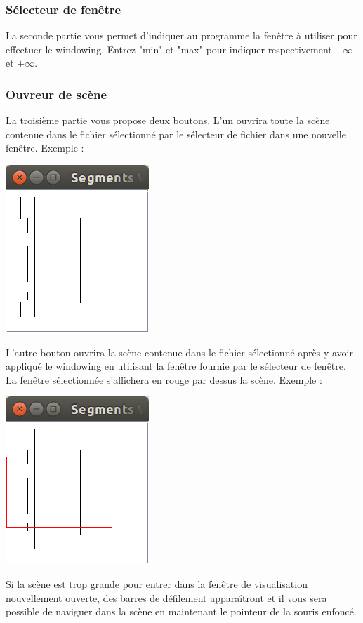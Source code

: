 \documentclass[10pt,a4paper]{article}
\begin{document}
\subsubsection{Sélecteur de fenêtre}
La seconde partie vous permet d'indiquer au programme la fenêtre à utiliser pour effectuer le windowing. Entrez "min" et "max" pour indiquer respectivement $-\infty$ et $+\infty$.

\subsubsection{Ouvreur de scène}
La troisième partie vous propose deux boutons. L'un ouvrira toute la scène contenue dans le fichier sélectionné par le sélecteur de fichier dans une nouvelle fenêtre. Exemple :

\centerline{\includegraphics[scale=0.5]{images/ui_whole_scene.png}}

L'autre bouton ouvrira la scène contenue dans le fichier sélectionné après y avoir appliqué le windowing en utilisant la fenêtre fournie par le sélecteur de fenêtre. La fenêtre sélectionnée s'affichera en rouge par dessus la scène. Exemple :

\centerline{\includegraphics[scale=0.5]{images/ui_restricted_window.png}}

Si la scène est trop grande pour entrer dans la fenêtre de visualisation nouvellement ouverte, des barres de défilement apparaîtront et il vous sera possible de naviguer dans la scène en maintenant le pointeur de la souris enfoncé.
\end{document}
